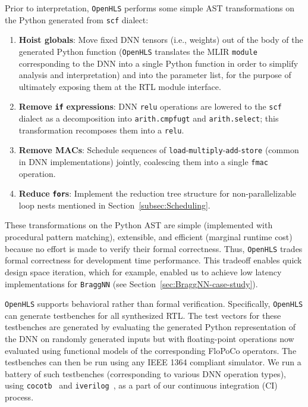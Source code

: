 \documentclass[10pt]{sig-alternate}
\begin{document}
Prior to interpretation, \texttt{OpenHLS} performs some simple AST
transformations on the Python generated from \texttt{scf} dialect:
\begin{enumerate}

\item \textbf{Hoist globals}: Move fixed DNN tensors (i.e., weights) out of the body of the generated Python function (\texttt{OpenHLS} translates the MLIR \texttt{module} corresponding
to the DNN into a single Python function in order to simplify analysis
and interpretation) and into the parameter list, for the purpose of ultimately exposing
them at the RTL module interface.

\item \textbf{Remove }\texttt{\textbf{if}}\textbf{ expressions}: DNN \texttt{relu}
operations are lowered to the \texttt{scf} dialect as a decomposition
into \texttt{arith.cmpfugt} and \texttt{arith.select}; this transformation
recomposes them into a \texttt{relu}.

\item \textbf{Remove MACs}: Schedule sequences of \texttt{load}-\texttt{multiply}-\texttt{add}-\texttt{store}
(common in DNN implementations)
jointly, coalescing them into a single
\texttt{fmac} operation.

\item \textbf{Reduce }\texttt{\textbf{for}}\textbf{s}:
Implement the reduction tree structure for non-parallelizable loop nests
mentioned in Section~\ref{subsec:Scheduling}.
\end{enumerate}

These transformations on the Python AST are simple (implemented with
procedural pattern matching), extensible, and efficient (marginal
runtime cost) because
no effort is made to verify
their formal correctness. Thus, \texttt{OpenHLS} trades formal correctness
for development time performance. This tradeoff enables quick design
space iteration, which for example, enabled us to achieve low
latency implementations for \texttt{BraggNN} (see Section~\ref{sec:BraggNN-case-study}).

\texttt{OpenHLS} supports
behavioral rather than formal verification. Specifically, \texttt{OpenHLS} can generate
testbenches for all synthesized RTL. The test vectors for these testbenches
are generated by evaluating the generated Python representation of
the DNN on randomly generated inputs but with floating-point operations
now evaluated using functional models of the corresponding FloPoCo
operators. The testbenches can then be run using any IEEE 1364 compliant
simulator. We run a battery of such testbenches (corresponding
to various DNN operation types), using \texttt{cocotb}~\cite{rosser2018cocotb}
and \texttt{iverilog}~\cite{williamsicarus}, as a part of our continuous integration (CI) process.
\end{document}
